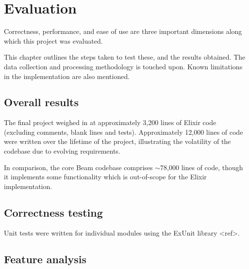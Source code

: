 \chapter{Evaluation}\label{ch:eval}


Correctness, performance, and ease of use are three important dimensions along which this project was evaluated.

This chapter outlines the steps taken to test these, and the results obtained.
The data collection and processing methodology is touched upon.
Known limitations in the implementation are also mentioned.


\section{Overall results}\label{sec:eval:overall}

The final project weighed in at approximately 3,200 lines of Elixir code (excluding comments, blank lines and tests).
Approximately 12,000 lines of code were written over the lifetime of the project, illustrating the volatility of the codebase due to evolving requirements.

In comparison, the core Beam codebase comprises $\sim$78,000 lines of code, though it implements some functionality which is out-of-scope for the Elixir implementation.

\section{Correctness testing}\label{sec:eval:correctness}

Unit tests were written for individual modules using the ExUnit library <ref>.

\section{Feature analysis}\label{sec:eval:limitations}

